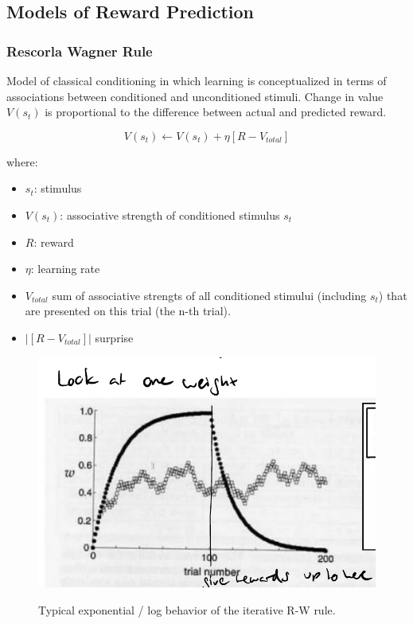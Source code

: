 \documentclass[main]{subfiles}
\begin{document}
\subsection{Models of Reward Prediction}

\subsubsection{Rescorla Wagner Rule}
Model of classical conditioning in which learning is conceptualized in terms of associations between conditioned and unconditioned stimuli. Change in value $V(s_t)$ is proportional to the difference between actual and predicted reward.

\begin{equation}
    V(s_{t}) \leftarrow V(s_t) + \eta[R- V_{total}]
\end{equation}

where:

\begin{itemize}
    \item $s_t$: stimulus
    \item $V(s_t)$: associative strength of conditioned stimulus $s_t$
    \item $R$: reward
    \item $\eta$: learning rate
    \item $V_{total}$ sum of associative strengts of all conditioned stimului (including $s_t$) that are presented on this trial (the n-th trial).
    \item $|[R- V_{total}]|$ surprise
\end{itemize}

\begin{figure}[H]
	\centering
	\includegraphics[width=0.9\linewidth]{08_ReinforcementLearning/figures/rw-rule.png}
	\label{fig:rw-rule}
	\caption{Typical exponential / log behavior of the iterative R-W rule.}
\end{figure}
\end{document}
